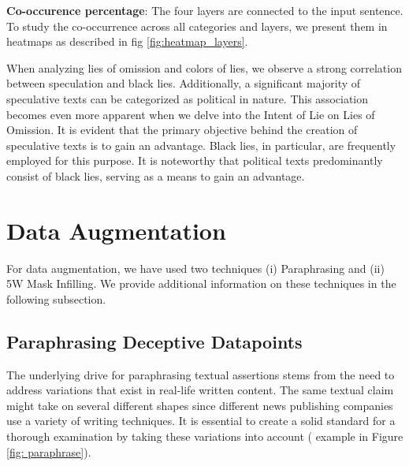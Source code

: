 




\noindent
\textbf{Co-occurence percentage}: The four layers are connected to the input sentence. To study the co-occurrence across all categories and layers, we present them in heatmaps as described in fig \ref{fig:heatmap_layers}.


When analyzing lies of omission and colors of lies, we observe a strong correlation between speculation and black lies. Additionally, a significant majority of speculative texts can be categorized as political in nature. This association becomes even more apparent when we delve into the Intent of Lie on Lies of Omission. It is evident that the primary objective behind the creation of speculative texts is to gain an advantage. Black lies, in particular, are frequently employed for this purpose. It is noteworthy that political texts predominantly consist of black lies, serving as a means to gain an advantage.




\newpage
\section{Data Augmentation}
For data augmentation, we have used two techniques (i) Paraphrasing and (ii) 5W Mask Infilling.
We provide additional information on these techniques in the following subsection.
\subsection{Paraphrasing Deceptive Datapoints}\label{sec:paraphrase-evaluation}


The underlying drive for paraphrasing textual assertions stems from the need to address variations that exist in real-life written content. The same textual claim might take on several different shapes since different news publishing companies use a variety of writing techniques. It is essential to create a solid standard for a thorough examination by taking these variations into account ( example in Figure \ref{fig: paraphrase}).


